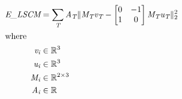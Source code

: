 \documentclass[12pt]{article}
\begin{document}
\begin{center}
\resizebox{\textwidth}{!} 
{
\begin{minipage}[c]{\textwidth}
\begin{align*}
\textit{E\_LSCM} & = \sum_\textit{T} \textit{A}_{ \textit{T} }\|\textit{M}_{ \textit{T} }\textit{v}_{ \textit{T} } - \begin{bmatrix}
0 & -1\\
1 & 0\\
\end{bmatrix}\textit{M}_{ \textit{T} }\textit{u}_{ \textit{T} }\|_2^{2} \\
\intertext{where} 
\textit{v}_{\textit{i}} & \in \mathbb{R}^{ 3} \\
\textit{u}_{\textit{i}} & \in \mathbb{R}^{ 3} \\
\textit{M}_{\textit{i}} & \in \mathbb{R}^{ 2 \times 3 } \\
\textit{A}_{\textit{i}} & \in \mathbb{R} \\
\\
\end{align*}
\end{minipage}
}
\end{center}
\end{document}
